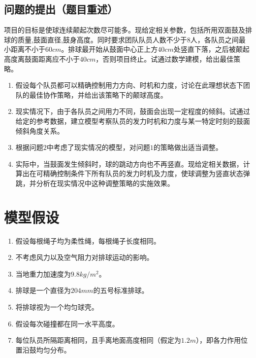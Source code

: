 \documentclass{cumcm}
\begin{document}
\subsection{问题的提出（题目重述）}
项目的目标是使球连续颠起次数尽可能多。现给定相关参数，包括所用双面鼓及排球的质量,鼓面直径,鼓身高度。同时要求团队队员人数不少于$8$人，各队员之间最小距离不小于$60cm$。排球最开始从鼓面中心正上方$40cm$处竖直下落，之后被颠起高度离鼓面距离应不小于$40cm$，否则项目终止。试通过数学建模，给出最佳策略。
\begin{enumerate}[(1)]
\item 假设每个队员都可以精确控制用力方向、时机和力度，讨论在此理想状态下团队的最佳协作策略，并给出该策略下的颠球高度。
\item 现实情况下，由于各队员之间用力不同，鼓面会出现一定程度的倾斜。试通过给定的参考数据，建立模型考察队员的发力时机和力度与某一特定时刻的鼓面倾斜角度关系。
\item 根据问题$2$中考虑了现实情况的模型，对问题$1$的策略做出适当调整。
\item 实际中，当鼓面发生倾斜时，球的跳动方向也不再竖直。现给定相关数据，计算出在可精确控制条件下所有队员的发力时机及力度，使球调整为竖直状态弹跳，并分析在现实情况中这种调整策略的实施效果。
\end{enumerate}

\section{模型假设}
\begin{enumerate}
\item 假设每根绳子均为柔性绳，每根绳子长度相同。
\item 不考虑风力以及空气阻力对排球运动的影响。
\item 当地重力加速度为$9.8kg/m^2$。
\item 排球是一个直径为$204mm$的五号标准排球。
\item 将排球视为一个均匀球壳。
 \item 假设每次碰撞都在同一水平高度。
\item 每位队员所隔距离相同，且手离地面高度相同（假定为$1.2m$），即各力作用位置沿鼓均匀分布。
\end{enumerate}

\newpage
\end{document}
